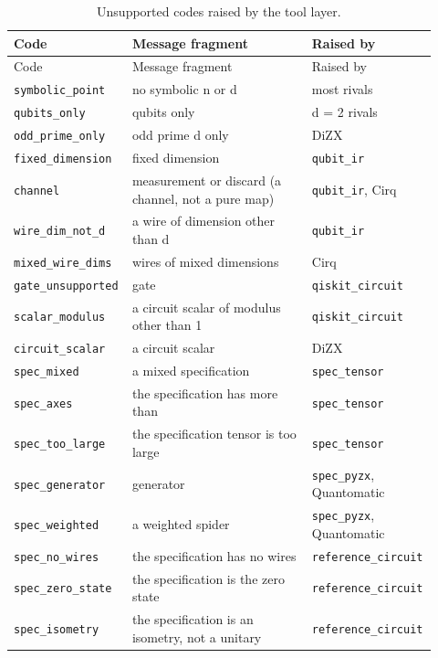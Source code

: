 \begin{longtable}{@{}>{\raggedright\arraybackslash}p{0.27\linewidth}>{\raggedright\arraybackslash}p{0.42\linewidth}>{\raggedright\arraybackslash}p{0.23\linewidth}@{}}
\caption{Unsupported codes raised by the tool layer.}\label{tab:bench-tools-unsupported}\\
\toprule
Code & Message fragment & Raised by \\
\midrule
\endfirsthead
\toprule
Code & Message fragment & Raised by \\
\midrule
\endhead
\bottomrule
\endfoot
\texttt{symbolic\_point} & no symbolic n or d & most rivals \\
\texttt{qubits\_only} & qubits only & d = 2 rivals \\
\texttt{odd\_prime\_only} & odd prime d only & DiZX \\
\texttt{fixed\_dimension} & fixed dimension & \texttt{qubit\_ir} \\
\texttt{channel} & measurement or discard (a channel, not a pure map) & \texttt{qubit\_ir}, Cirq \\
\texttt{wire\_dim\_not\_d} & a wire of dimension other than d & \texttt{qubit\_ir} \\
\texttt{mixed\_wire\_dims} & wires of mixed dimensions & Cirq \\
\texttt{gate\_unsupported} & gate\textvisiblespace & \texttt{qiskit\_circuit} \\
\texttt{scalar\_modulus} & a circuit scalar of modulus other than 1 & \texttt{qiskit\_circuit} \\
\texttt{circuit\_scalar} & a circuit scalar & DiZX \\
\texttt{spec\_mixed} & a mixed specification & \texttt{spec\_tensor} \\
\texttt{spec\_axes} & the specification has more than & \texttt{spec\_tensor} \\
\texttt{spec\_too\_large} & the specification tensor is too large & \texttt{spec\_tensor} \\
\texttt{spec\_generator} & generator\textvisiblespace & \texttt{spec\_pyzx}, Quantomatic \\
\texttt{spec\_weighted} & a weighted spider & \texttt{spec\_pyzx}, Quantomatic \\
\texttt{spec\_no\_wires} & the specification has no wires & \texttt{reference\_circuit} \\
\texttt{spec\_zero\_state} & the specification is the zero state & \texttt{reference\_circuit} \\
\texttt{spec\_isometry} & the specification is an isometry, not a unitary & \texttt{reference\_circuit} \\

\end{longtable}
